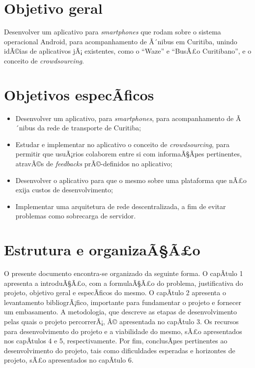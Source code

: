 \section{Objetivo geral}

Desenvolver um aplicativo para \textit{smartphones} que rodam sobre o sistema operacional Android, para acompanhamento de Ã´nibus em Curitiba, unindo idÃ©ias de aplicativos jÃ¡ existentes, como o ``Waze''  e ``BusÃ£o Curitibano'', e o conceito de \textit{crowdsourcing}.

\section{Objetivos especÃ­ficos}

\begin{itemize}
\item Desenvolver um aplicativo, para \textit{smartphones}, para acompanhamento de Ã´nibus da rede de transporte de Curitiba;
\item Estudar e implementar no aplicativo o conceito de \textit{crowdsourcing}, para permitir que usuÃ¡rios colaborem entre si com informaÃ§Ãµes pertinentes, atravÃ©s de \textit{feedbacks} prÃ©-definidos no aplicativo;
\item Desenvolver o aplicativo para que o mesmo  sobre uma plataforma que nÃ£o exija custos de desenvolvimento;
\item Implementar uma arquitetura de rede descentralizada, a fim de evitar problemas como sobrecarga de servidor.
\end{itemize}

\section{Estrutura e organizaÃ§Ã£o}

O presente documento encontra-se organizado da seguinte forma. O capÃ­tulo 1 apresenta a introduÃ§Ã£o, com a formulaÃ§Ã£o do problema, justificativa do projeto, objetivo geral e especÃ­ficos do mesmo. O capÃ­tulo 2 apresenta o levantamento bibliogrÃ¡fico, importante para fundamentar o projeto e fornecer um embasamento. A metodologia, que descreve as etapas de desenvolvimento pelas quais o projeto percorrerÃ¡, Ã© apresentada no capÃ­tulo 3. Os recursos para desenvolvimento do projeto e a viabilidade do mesmo, sÃ£o apresentados nos capÃ­tulos 4 e 5, respectivamente. Por fim, conclusÃµes pertinentes ao desenvolvimento do projeto, tais como dificuldades esperadas e horizontes de projeto, sÃ£o apresentados no capÃ­tulo 6.